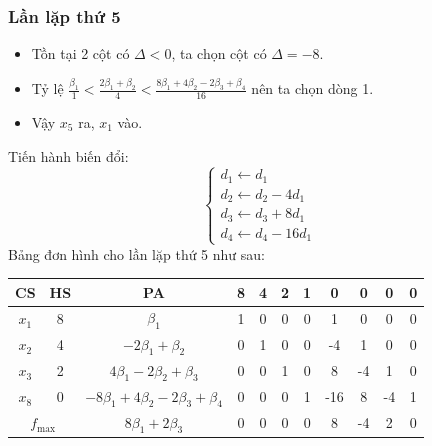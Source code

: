 \documentclass[12pt]{article}
\begin{document}
\subsubsection{Lần lặp thứ 5}
\begin{itemize}
\item Tồn tại 2 cột có $\Delta < 0$, ta chọn cột có $\Delta = -8$.
\item Tỷ lệ $\displaystyle \frac{\beta_1}{1} < \frac{2\beta_1 + \beta_2}{4} < \frac{8\beta_1 + 4\beta_2 - 2\beta_3 + \beta_4}{16}$ nên ta chọn dòng 1.
\item Vậy $x_5$ ra, $x_1$ vào.
\end{itemize}
Tiến hành biến đổi:
$$
\left\{
\begin{array}{lll}
d_1 \leftarrow d_1 \\
d_2 \leftarrow d_2 - 4d_1 \\
d_3 \leftarrow d_3 + 8d_1\\
d_4 \leftarrow d_4 - 16d_1
\end{array}
\right.
$$
Bảng đơn hình cho lần lặp thứ 5 như sau:
\begin{table}[H]
\centering
\begin{tabular}{|c|c|c|c|c|c|c|c|c|c|c|}
\hline
CS & HS & PA & 8 & 4 & 2 & 1 & 0 & 0 & 0 & 0 \\
\hline
$x_1$ & 8 & $\beta_1$ & 1 & 0 & 0 & 0 & 1 & 0 & 0 & 0 \\
$x_2$ & 4 & $-2\beta_1 + \beta_2$ & 0 & 1 & 0 & 0 & -4 & 1 & 0 & 0 \\
$x_3$ & 2 & $4\beta_1 - 2\beta_2 + \beta_3$ & 0 & 0 & 1 & 0 & 8 & -4 & 1 & 0 \\
$x_8$ & 0 & $-8\beta_1 + 4\beta_2 - 2\beta_3 + \beta_4$ & 0 & 0 & 0 & 1 & -16 & 8 & -4 & 1 \\
\hline
\multicolumn{2}{|c|}{$f_{\max}$}
& $8\beta_1 + 2\beta_3$ & 0 & 0 & 0 & 0 & 8 & -4 & 2 & 0 \\
\hline
\end{tabular}
\end{table}
\end{document}
